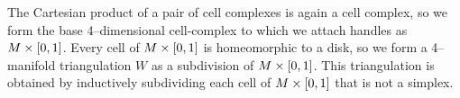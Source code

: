 


The Cartesian product of a pair of cell complexes is again a cell complex, so we form the base 4--dimensional cell-complex to which we attach handles as $M\times[0,1]$.
Every cell of $M\times[0,1]$ is homeomorphic to a disk, so we form a 4--manifold triangulation $W$ as a subdivision of $M\times[0,1]$.
This triangulation is obtained by inductively subdividing each cell of $M\times[0,1]$ that is not a simplex.




%
%
%
%
%
%
%
%
